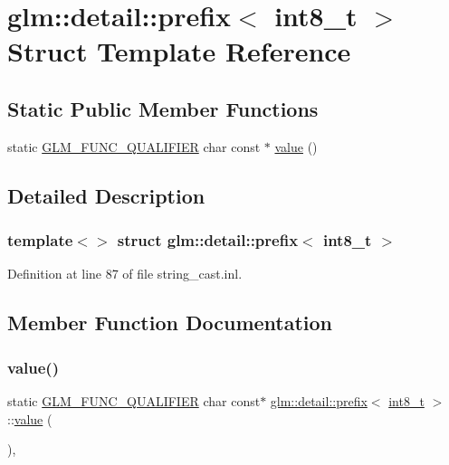\hypertarget{structglm_1_1detail_1_1prefix_3_01int8__t_01_4}{}\section{glm\+::detail\+::prefix$<$ int8\+\_\+t $>$ Struct Template Reference}
\label{structglm_1_1detail_1_1prefix_3_01int8__t_01_4}
\subsection*{Static Public Member Functions}
\begin{DoxyCompactItemize}
\item 
static \mbox{\hyperlink{setup_8hpp_a33fdea6f91c5f834105f7415e2a64407}{G\+L\+M\+\_\+\+F\+U\+N\+C\+\_\+\+Q\+U\+A\+L\+I\+F\+I\+ER}} char const  $\ast$ \mbox{\hyperlink{structglm_1_1detail_1_1prefix_3_01int8__t_01_4_afb4b2223c44e4e8f75bde375b0f874a2}{value}} ()
\end{DoxyCompactItemize}


\subsection{Detailed Description}
\subsubsection*{template$<$$>$\newline
struct glm\+::detail\+::prefix$<$ int8\+\_\+t $>$}



Definition at line 87 of file string\+\_\+cast.\+inl.



\subsection{Member Function Documentation}
\mbox{\label{structglm_1_1detail_1_1prefix_3_01int8__t_01_4_afb4b2223c44e4e8f75bde375b0f874a2}} 
\subsubsection{\texorpdfstring{value()}{value()}}
{\footnotesize\ttfamily static \mbox{\hyperlink{setup_8hpp_a33fdea6f91c5f834105f7415e2a64407}{G\+L\+M\+\_\+\+F\+U\+N\+C\+\_\+\+Q\+U\+A\+L\+I\+F\+I\+ER}} char const$\ast$ \mbox{\hyperlink{structglm_1_1detail_1_1prefix}{glm\+::detail\+::prefix}}$<$ \mbox{\hyperlink{group__gtc__type__precision_ga673898d450b2a91186f3c4f40c5f8633}{int8\+\_\+t}} $>$\+::\mbox{\hyperlink{glad_8h_a03aff08f73d7fde3d1a08e0abd8e84fa}{value}} (\begin{DoxyParamCaption}{ }\end{DoxyParamCaption})\hspace{0.3cm}{\ttfamily [inline]}, {\ttfamily [static]}}



